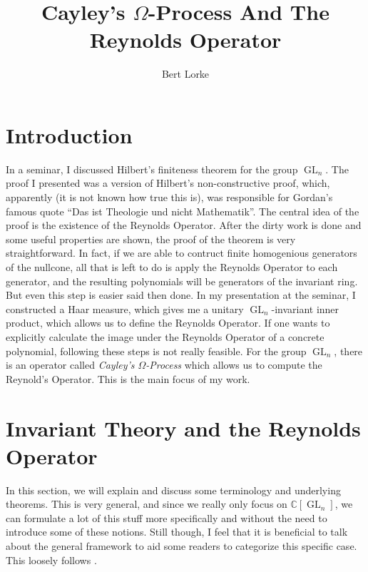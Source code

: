 \documentclass{article}
\title{Cayley's $\Omega$-Process And The Reynolds Operator}
\author{Bert Lorke}
\theoremstyle{prrt}
\begin{document}


\maketitle

\section{Introduction}

In a seminar, I discussed Hilbert's finiteness theorem for the group $\operatorname{GL}_n$.
The proof I presented was a version of Hilbert's non-constructive proof, which, apparently (it is not known how true this is), was responsible for Gordan's famous quote ``Das ist Theologie und nicht Mathematik''.
The central idea of the proof is the existence of the Reynolds Operator.
After the dirty work is done and some useful properties are shown, the proof of the theorem is very straightforward.
In fact, if we are able to contruct finite homogenious generators of the nullcone, all that is left to do is apply the Reynolds Operator to each generator, and the resulting polynomials will be generators of the invariant ring.
But even this step is easier said then done.
In my presentation at the seminar, I constructed a Haar measure, which gives me a unitary $\operatorname{GL}_n$-invariant inner product, which allows us to define the Reynolds Operator. If one wants to explicitly calculate the image under the Reynolds Operator of a concrete polynomial, following these steps is not really feasible.
For the group $\operatorname{GL}_n$, there is an operator called \textit{Cayley's $\Omega$-Process} which allows us to compute the Reynold's Operator.
This is the main focus of my work.

\section{Invariant Theory and the Reynolds Operator}

In this section, we will explain and discuss some terminology and underlying theorems.
This is very general, and since we really only focus on $\mathbb{C}[\operatorname{GL}_n]$, we can formulate a lot of this stuff more specifically and without the need to introduce some of these notions.
Still though, I feel that it is beneficial to talk about the general framework to aid some readers to categorize this specific case.\\
This loosely follows \cite[p.31]{DK15}.

\end{document}
